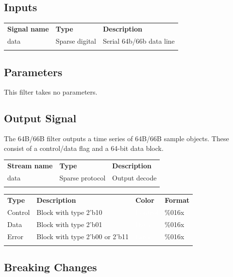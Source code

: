 \subsection{Inputs}

\begin{tabularx}{16cm}{llX}
\thickhline
\textbf{Signal name} & \textbf{Type} & \textbf{Description} \\
\thickhline
data & Sparse digital & Serial 64b/66b data line \\
\thickhline
\end{tabularx}

\subsection{Parameters}

This filter takes no parameters.

\subsection{Output Signal}

The 64B/66B filter outputs a time series of 64B/66B sample objects. These consist of a control/data flag and
a 64-bit data block.

\begin{tabularx}{16cm}{llX}
\thickhline
\textbf{Stream name} & \textbf{Type} & \textbf{Description} \\
\thickhline
data & Sparse protocol & Output decode \\
\thickhline
\end{tabularx}

\begin{tabularx}{16cm}{lllX}
\thickhline
\textbf{Type} & \textbf{Description} & \textbf{Color} & \textbf{Format} \\
\thickhline
Control & Block with type 2'b10 & \cellcolor{control}\textcolor{white}{Control} & \%016x \\
\thinhline
Data & Block with type 2'b01 & \cellcolor{data}\textcolor{white}{Data} & \%016x \\
\thinhline
Error & Block with type 2'b00 or 2'b11 & \cellcolor{error}\textcolor{white}{Error} & \%016x \\
\thickhline
\end{tabularx}

\subsection{Breaking Changes}

